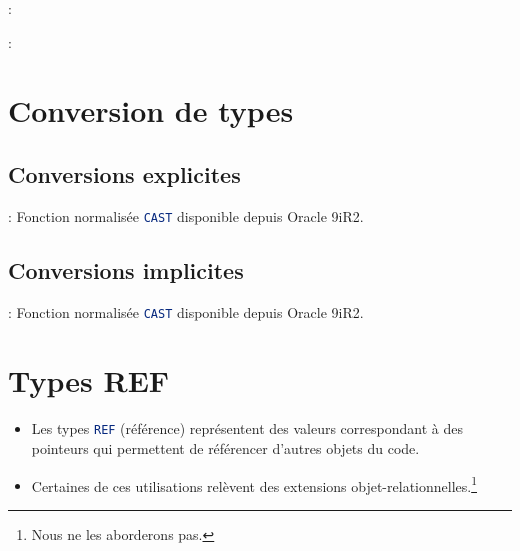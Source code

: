 \documentclass[10pt]{beamer}
\begin{document}
\begin{frame}{\secname : \subsecname}
    
\end{frame}

\begin{frame}{\secname : \subsecname}
    
\end{frame}

\section{Conversion de types}
\subsection{Conversions explicites}
\begin{frame}{\secname : \subsecname}
    Fonction normalisée \lstinline[language=sql]!CAST! disponible depuis Oracle 9iR2.
    
\end{frame}

\subsection{Conversions implicites}
\begin{frame}{\secname : \subsecname}
    Fonction normalisée \lstinline[language=sql]!CAST! disponible depuis Oracle 9iR2.
    
\end{frame}

\section{Types REF}
\begin{frame}{\secname}
    \begin{itemize}
        \item Les types \lstinline[language=sql]!REF! (référence) représentent des valeurs correspondant à des pointeurs qui permettent de référencer d'autres objets du code.
        \item Certaines de ces utilisations relèvent des extensions objet-relationnelles.\footnote{Nous ne les aborderons pas.}
    \end{itemize}
\end{frame}
\end{document}
